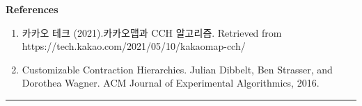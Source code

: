 \documentclass[12pt]{exam}
\begin{document}
\textbf{References}
\begin{enumerate}
  \item 카카오 테크 (2021).카카오맵과 CCH 알고리즘. \newline Retrieved from https://tech.kakao.com/2021/05/10/kakaomap-cch/
  \item Customizable Contraction Hierarchies. Julian Dibbelt, Ben Strasser, and Dorothea Wagner. ACM Journal of Experimental Algorithmics, 2016.
\end{enumerate}

\vspace{5mm}
\rule[1ex]{\textwidth}{1pt}
\end{document}

